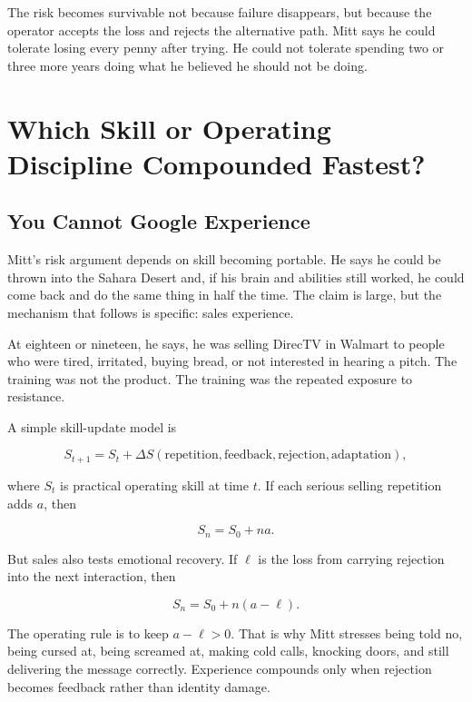 \documentclass[11pt,oneside]{book}
\begin{document}
The risk becomes survivable not because failure disappears, but because the operator accepts the loss and rejects the alternative path. Mitt says he could tolerate losing every penny after trying. He could not tolerate spending two or three more years doing what he believed he should not be doing.

\chapter{Which Skill or Operating Discipline Compounded Fastest?}

\section{You Cannot Google Experience}

Mitt's risk argument depends on skill becoming portable. He says he could be thrown into the Sahara Desert and, if his brain and abilities still worked, he could come back and do the same thing in half the time. The claim is large, but the mechanism that follows is specific: sales experience.

At eighteen or nineteen, he says, he was selling DirecTV in Walmart to people who were tired, irritated, buying bread, or not interested in hearing a pitch. The training was not the product. The training was the repeated exposure to resistance.

A simple skill-update model is

\begin{equation}
S_{t+1}
=
S_t+\Delta S(\text{repetition},\text{feedback},\text{rejection},\text{adaptation}),
\end{equation}

where \(S_t\) is practical operating skill at time \(t\). If each serious selling repetition adds \(a\), then

\begin{equation}
S_n=S_0+na.
\end{equation}

But sales also tests emotional recovery. If \(\ell\) is the loss from carrying rejection into the next interaction, then

\begin{equation}
S_n=S_0+n(a-\ell).
\end{equation}

The operating rule is to keep \(a-\ell>0\). That is why Mitt stresses being told no, being cursed at, being screamed at, making cold calls, knocking doors, and still delivering the message correctly. Experience compounds only when rejection becomes feedback rather than identity damage.
\end{document}
